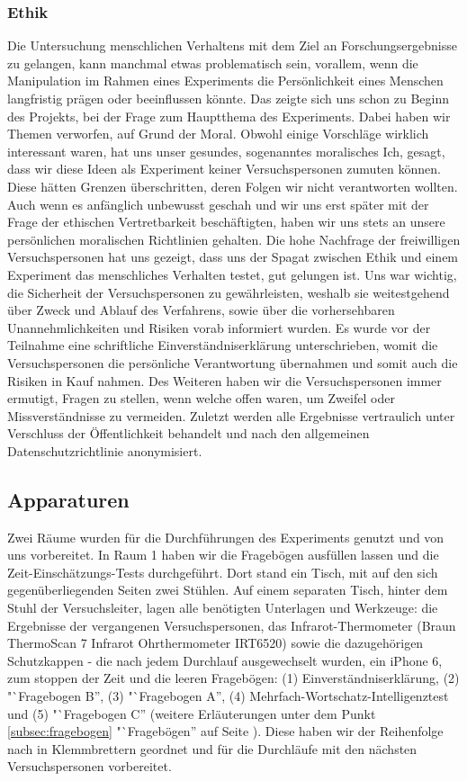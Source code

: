 \documentclass{Bericht}
\begin{document}
\subsubsection {Ethik}
Die Untersuchung menschlichen Verhaltens mit dem Ziel an Forschungsergebnisse zu gelangen, kann manchmal etwas problematisch sein, vorallem, wenn die Manipulation im Rahmen eines Experiments die Persönlichkeit eines Menschen langfristig prägen oder beeinflussen könnte. Das zeigte sich uns schon zu Beginn des Projekts, bei der Frage zum Hauptthema des Experiments. Dabei haben wir Themen verworfen, auf Grund der Moral. Obwohl einige Vorschläge wirklich interessant waren, hat uns unser gesundes, sogenanntes moralisches Ich, gesagt, dass wir diese Ideen als Experiment keiner Versuchspersonen zumuten können. Diese hätten Grenzen überschritten, deren Folgen wir nicht verantworten wollten. Auch wenn es anfänglich unbewusst geschah und wir uns erst später mit der Frage der ethischen Vertretbarkeit beschäftigten, haben wir uns stets an unsere persönlichen moralischen Richtlinien gehalten. Die hohe Nachfrage der freiwilligen Versuchspersonen hat uns gezeigt, dass uns der Spagat zwischen Ethik und einem Experiment  das menschliches Verhalten testet, gut gelungen ist. Uns war wichtig, die Sicherheit der Versuchspersonen zu gewährleisten, weshalb sie weitestgehend über Zweck und Ablauf des Verfahrens, sowie über die vorhersehbaren Unannehmlichkeiten und Risiken vorab informiert wurden. Es wurde vor der Teilnahme eine schriftliche Einverständniserklärung unterschrieben, womit die Versuchspersonen die persönliche Verantwortung übernahmen und somit auch die Risiken in Kauf nahmen. Des Weiteren haben wir die Versuchspersonen immer ermutigt, Fragen zu stellen, wenn welche offen waren, um Zweifel oder Missverständnisse zu vermeiden. Zuletzt werden alle Ergebnisse vertraulich unter Verschluss der Öffentlichkeit behandelt und nach den allgemeinen Datenschutzrichtlinie anonymisiert.

\subsection {Apparaturen}
Zwei Räume wurden für die Durchführungen des Experiments genutzt und von uns vorbereitet. In Raum 1 haben wir die Fragebögen ausfüllen lassen und die Zeit-Einschätzungs-Tests durchgeführt. Dort stand ein Tisch, mit auf den sich gegenüberliegenden Seiten zwei Stühlen. Auf einem separaten Tisch, hinter dem Stuhl der Versuchsleiter, lagen alle benötigten Unterlagen und Werkzeuge: die Ergebnisse der vergangenen Versuchspersonen, das Infrarot-Thermometer (Braun ThermoScan 7 Infrarot Ohrthermometer IRT6520) sowie die dazugehörigen Schutzkappen - die nach jedem Durchlauf ausgewechselt wurden, ein iPhone 6, zum stoppen der Zeit und die leeren Fragebögen: (1) Einverständniserklärung, (2)  "`Fragebogen B'', (3) "`Fragebogen A'', (4) Mehrfach-Wortschatz-Intelligenztest und (5) "`Fragebogen C'' (weitere Erläuterungen unter dem Punkt \ref{subsec:fragebogen} "`Fragebögen'' auf Seite \pageref{subsec:fragebogen}). Diese haben wir der Reihenfolge nach in Klemmbrettern geordnet und für die Durchläufe mit den nächsten Versuchspersonen vorbereitet. 
\end{document}
